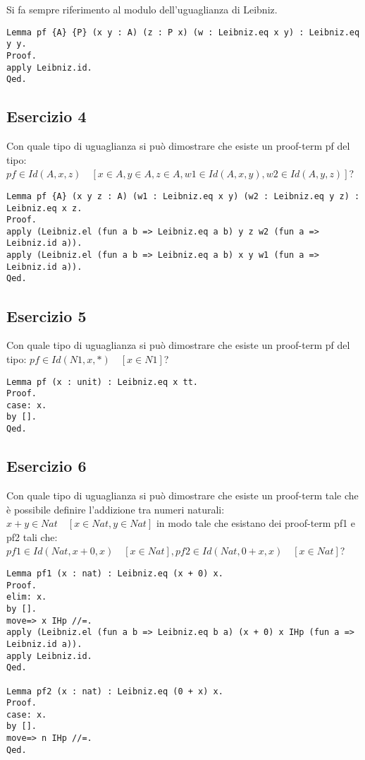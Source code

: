 Si fa sempre riferimento al modulo dell'uguaglianza di Leibniz.

\begin{lstlisting}[language=Coq]
Lemma pf {A} {P} (x y : A) (z : P x) (w : Leibniz.eq x y) : Leibniz.eq y y.
Proof.
apply Leibniz.id.
Qed.
\end{lstlisting}

\subsection{Esercizio 4}

Con quale tipo di uguaglianza si può dimostrare che esiste un proof-term pf del
tipo: $pf \in Id(A,x,z) \quad [x \in A, y \in A, z \in A, w1 \in Id(A,x,y), w2 \in Id(A,y,z)]$?

\begin{lstlisting}[language=Coq]
Lemma pf {A} (x y z : A) (w1 : Leibniz.eq x y) (w2 : Leibniz.eq y z) : Leibniz.eq x z.
Proof.
apply (Leibniz.el (fun a b => Leibniz.eq a b) y z w2 (fun a => Leibniz.id a)).
apply (Leibniz.el (fun a b => Leibniz.eq a b) x y w1 (fun a => Leibniz.id a)).
Qed.
\end{lstlisting}

\subsection{Esercizio 5}

Con quale tipo di uguaglianza si può dimostrare che esiste un proof-term pf del
tipo: $pf \in Id(N1, x, *) \quad [x \in N1]$?

\begin{lstlisting}[language=Coq]
Lemma pf (x : unit) : Leibniz.eq x tt.
Proof.
case: x.
by [].
Qed.
\end{lstlisting}

\subsection{Esercizio 6}

Con quale tipo di uguaglianza si può dimostrare che esiste un proof-term tale
che è possibile definire l'addizione tra numeri naturali:
$x + y \in Nat \quad [x \in Nat, y \in Nat]$ in modo tale che esistano dei proof-term pf1 e pf2 tali che: $pf1 \in Id(Nat, x + 0, x) \quad [x \in Nat], pf2 \in Id(Nat, 0 + x, x) \quad [x \in Nat]$?

\begin{lstlisting}[language=Coq]
Lemma pf1 (x : nat) : Leibniz.eq (x + 0) x.
Proof.
elim: x.
by [].
move=> x IHp //=.
apply (Leibniz.el (fun a b => Leibniz.eq b a) (x + 0) x IHp (fun a => Leibniz.id a)).
apply Leibniz.id.
Qed.

Lemma pf2 (x : nat) : Leibniz.eq (0 + x) x.
Proof.
case: x.
by [].
move=> n IHp //=.
Qed.
\end{lstlisting}

